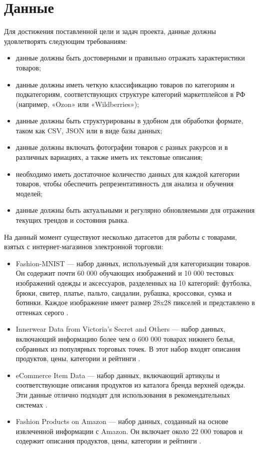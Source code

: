 \documentclass[a4paper,12pt]{extarticle}
\begin{document}
\newpage
\section{Данные} 

Для достижения поставленной цели и задач проекта, данные должны удовлетворять следующим требованиям:
\begin{itemize}
	\item данные должны быть достоверными и правильно отражать характеристики товаров;
	\item данные должны иметь четкую классификацию товаров по категориям и подкатегориям, соответствующих структуре категорий маркетплейсов в РФ (например, «Ozon» или «Wildberries»);
	\item данные должны быть структурированы в удобном для обработки формате, таком как CSV, JSON или в виде базы данных;
	\item данные должны включать фотографии товаров с разных ракурсов и в различных вариациях, а также иметь их текстовые описания;
	\item необходимо иметь достаточное количество данных для каждой категории товаров, чтобы обеспечить репрезентативность для анализа и обучения моделей;
	\item данные должны быть актуальными и регулярно обновляемыми для отражения текущих трендов и состояния рынка.
\end{itemize}

На данный момент существуют несколько датасетов для работы с товарами, взятых с интернет-магазинов электронной торговли:
\begin{itemize}
	\item Fashion-MNIST — набор данных, используемый для категоризации товаров. Он содержит почти 60 000 обучающих изображений и 10 000 тестовых изображений одежды и аксессуаров, разделенных на 10 категорий: футболка, брюки, свитер, платье, пальто, сандалии, рубашка, кроссовки, сумка и ботинки. Каждое изображение имеет размер 28x28 пикселей и представлено в оттенках серого \cite{fashion_mnist}.
	\item Innerwear Data from Victoria's Secret and Others — набор данных, включающий информацию более чем о 600 000 товарах нижнего белья, собранных из популярных торговых точек. В этот набор входят описания продуктов, цены, категории и рейтинги \cite{victoria_secret_data}.
	\item eCommerce Item Data — набор данных, включающий артикулы и соответствующие описания продуктов из каталога бренда верхней одежды. Эти данные отлично подходят для использования в рекомендательных системах \cite{eсommerce_item_data}.
	\item Fashion Products on Amazon — набор данных, созданный на основе извлеченной информации с Amazon. Он включает около 22 000 товаров и содержит описания продуктов, цены, категории и рейтинги \cite{amazon_data}.
\end{itemize}
\end{document}
